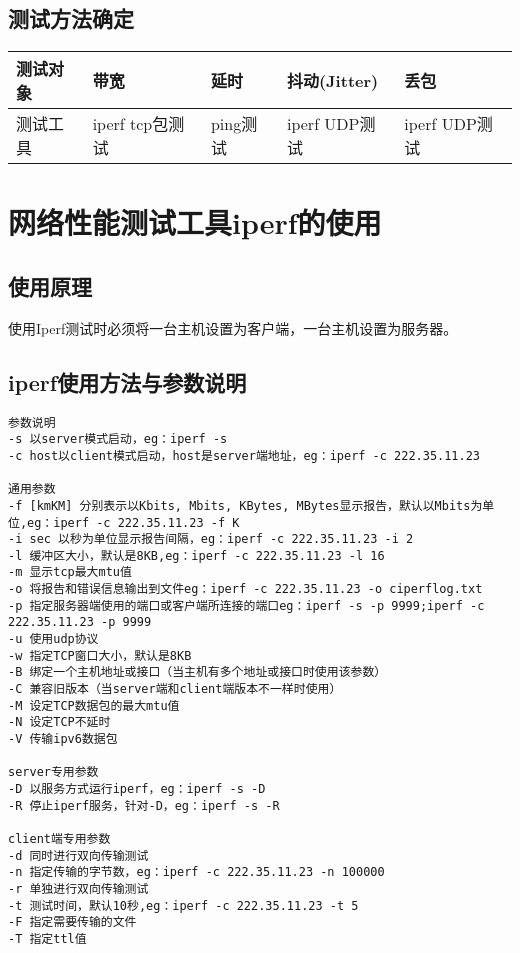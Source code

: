 \documentclass[a4paper,left=1.5cm,right=1.5cm,11pt]{article}
\begin{document}
\subsection{测试方法确定}
\begin{center}
\begin{tabular}[c]{|l|l|l|l|l|}
\hline
测试对象 & 带宽 & 延时 & 抖动(Jitter) & 丢包 \\
\hline
测试工具 & iperf tcp包测试 & ping测试 & iperf UDP测试 & iperf UDP测试 \\
\hline
\end{tabular}
\end{center}

\section{网络性能测试工具iperf的使用}
\subsection{使用原理}
使用Iperf测试时必须将一台主机设置为客户端，一台主机设置为服务器。
\subsection{iperf使用方法与参数说明}
\begin{lstlisting}
参数说明
-s 以server模式启动，eg：iperf -s
-c host以client模式启动，host是server端地址，eg：iperf -c 222.35.11.23
 
通用参数
-f [kmKM] 分别表示以Kbits, Mbits, KBytes, MBytes显示报告，默认以Mbits为单位,eg：iperf -c 222.35.11.23 -f K
-i sec 以秒为单位显示报告间隔，eg：iperf -c 222.35.11.23 -i 2
-l 缓冲区大小，默认是8KB,eg：iperf -c 222.35.11.23 -l 16
-m 显示tcp最大mtu值
-o 将报告和错误信息输出到文件eg：iperf -c 222.35.11.23 -o ciperflog.txt
-p 指定服务器端使用的端口或客户端所连接的端口eg：iperf -s -p 9999;iperf -c 222.35.11.23 -p 9999
-u 使用udp协议
-w 指定TCP窗口大小，默认是8KB
-B 绑定一个主机地址或接口（当主机有多个地址或接口时使用该参数）
-C 兼容旧版本（当server端和client端版本不一样时使用）
-M 设定TCP数据包的最大mtu值
-N 设定TCP不延时
-V 传输ipv6数据包
 
server专用参数
-D 以服务方式运行iperf，eg：iperf -s -D
-R 停止iperf服务，针对-D，eg：iperf -s -R
 
client端专用参数
-d 同时进行双向传输测试
-n 指定传输的字节数，eg：iperf -c 222.35.11.23 -n 100000
-r 单独进行双向传输测试
-t 测试时间，默认10秒,eg：iperf -c 222.35.11.23 -t 5
-F 指定需要传输的文件
-T 指定ttl值
\end{lstlisting}
\end{document}
